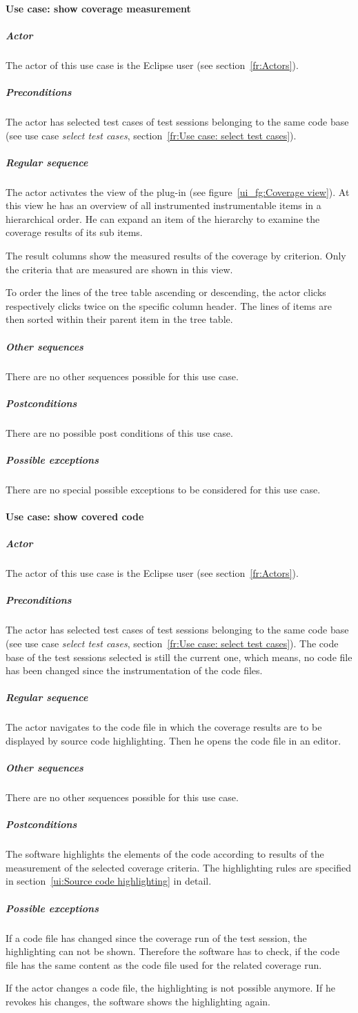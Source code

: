 \paragraph{Use case: show coverage measurement} \label{fr:Use case: show coverage measurement}
\subparagraph{Actor}
The actor of this use case is the Eclipse user (see section~\ref{fr:Actors}).
\subparagraph{Preconditions}
The actor has selected test cases of test sessions belonging to the same code base (see use case \textit{select test cases}, section~\ref{fr:Use case: select test cases}).
\subparagraph{Regular sequence}
The actor activates the  view of the plug-in (see figure~\ref{ui_fg:Coverage view}). At this view he has an overview of all instrumented instrumentable items in a hierarchical order. He can expand an item of the hierarchy to examine the coverage results of its sub items.
\par
The result columns show the measured results of the coverage by criterion. Only the criteria that are measured are shown in this view.
\par
To order the lines of the tree table ascending or descending, the actor clicks respectively clicks twice on the specific column header. The lines of items are then sorted within their parent item in the tree table.
\subparagraph{Other sequences}
There are no other sequences possible for this use case.
\subparagraph{Postconditions}
There are no possible post conditions of this use case.
\subparagraph{Possible exceptions}
There are no special possible exceptions to be considered for this use case.

\paragraph{Use case: show covered code} \label{fr:Use case: show covered code}
\subparagraph{Actor}
The actor of this use case is the Eclipse user (see section~\ref{fr:Actors}).
\subparagraph{Preconditions}
The actor has selected test cases of test sessions belonging to the same code base (see use case \textit{select test cases}, section~\ref{fr:Use case: select test cases}). The code base of the test sessions selected is still the current one, which means, no code file has been changed since the instrumentation of the code files.
\subparagraph{Regular sequence}
The actor navigates to the code file in which the coverage results are to be displayed by source code highlighting. Then he opens the code file in an editor.
\subparagraph{Other sequences}
There are no other sequences possible for this use case.
\subparagraph{Postconditions}
The software highlights the elements of the code according to results of the measurement of the selected coverage criteria. The highlighting rules are specified in section~\ref{ui:Source code highlighting} in detail.
\subparagraph{Possible exceptions}
If a code file has changed since the coverage run of the test session, the highlighting can not be shown. Therefore the software has to check, if the code file has the same content as the code file used for the related coverage run.
\par
If the actor changes a code file, the highlighting is not possible anymore. If he revokes his changes, the software shows the highlighting again.

